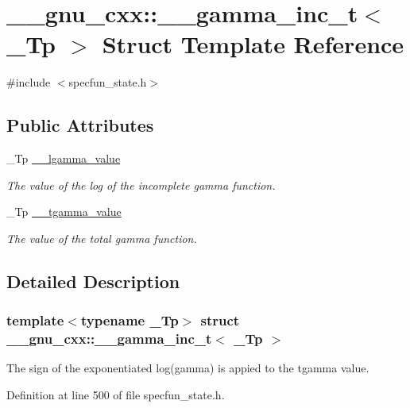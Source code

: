 \hypertarget{struct____gnu__cxx_1_1____gamma__inc__t}{}\section{\+\_\+\+\_\+gnu\+\_\+cxx\+:\+:\+\_\+\+\_\+gamma\+\_\+inc\+\_\+t$<$ \+\_\+\+Tp $>$ Struct Template Reference}
\label{struct____gnu__cxx_1_1____gamma__inc__t}


{\ttfamily \#include $<$specfun\+\_\+state.\+h$>$}

\subsection*{Public Attributes}
\begin{DoxyCompactItemize}
\item 
\+\_\+\+Tp \hyperlink{struct____gnu__cxx_1_1____gamma__inc__t_a193b3f7871e371363571fe90b1ce1767}{\+\_\+\+\_\+lgamma\+\_\+value}
\begin{DoxyCompactList}\small\item\em The value of the log of the incomplete gamma function. \end{DoxyCompactList}\item 
\+\_\+\+Tp \hyperlink{struct____gnu__cxx_1_1____gamma__inc__t_a53d4ffc984c6685ce328caff424b5fe4}{\+\_\+\+\_\+tgamma\+\_\+value}
\begin{DoxyCompactList}\small\item\em The value of the total gamma function. \end{DoxyCompactList}\end{DoxyCompactItemize}


\subsection{Detailed Description}
\subsubsection*{template$<$typename \+\_\+\+Tp$>$\newline
struct \+\_\+\+\_\+gnu\+\_\+cxx\+::\+\_\+\+\_\+gamma\+\_\+inc\+\_\+t$<$ \+\_\+\+Tp $>$}

The sign of the exponentiated log(gamma) is appied to the tgamma value. 

Definition at line 500 of file specfun\+\_\+state.\+h.



